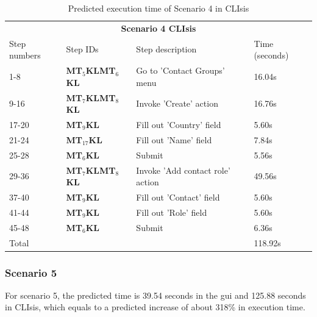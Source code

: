 \begin{table}[H]
	\center
	
	\begin{tabular}{llll}
		\toprule
		\multicolumn{4}{c}{\textbf{Scenario 4 CLIsis}} \\
		\addlinespace[0.5em]
		Step numbers & Step IDs & Step description & Time (seconds) \\
		\midrule
		1-8 		& \textbf{MT$_5$KLMT$_6$KL}		& Go to 'Contact Groups' menu		& 16.04s \\
		9-16		& \textbf{MT$_7$KLMT$_8$KL}		& Invoke 'Create' action					& 16.76s \\
		17-20	& \textbf{MT$_9$KL}							& Fill out 'Country' field					& 5.60s \\
		21-24	& \textbf{MT$_{17}$KL}					& Fill out 'Name' field						& 7.84s \\
		25-28	& \textbf{MT$_6$KL}							& Submit											& 5.56s \\
		29-36	& \textbf{MT$_7$KLMT$_8$KL}		& Invoke 'Add contact role' action	& 49.56s \\
		37-40	& \textbf{MT$_9$KL}							& Fill out 'Contact' field					& 5.60s \\
		41-44	& \textbf{MT$_9$KL}							& Fill out 'Role' field							& 5.60s \\
		45-48	& \textbf{MT$_6$KL}							& Submit											& 6.36s \\
		\midrule
		\multicolumn{3}{l}{Total}																						& 118.92s\\
		\bottomrule
	\end{tabular}
	
	\caption{Predicted execution time of Scenario 4 in CLIsis}
	\label{table:gomsscenario4clisis}
\end{table}

\subsubsection{Scenario 5}
For scenario 5, the predicted time is 39.54 seconds in the \acrshort{gui} and 125.88 seconds in CLIsis, which equals to a predicted increase of about 318\% in execution time.


